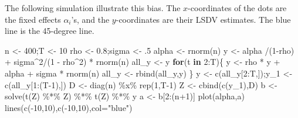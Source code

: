 \documentclass[
  12pt,
]{book}
\newenvironment{Shaded}{\begin{snugshade}}{\end{snugshade}}
\newcommand{\AttributeTok}[1]{\textcolor[rgb]{0.77,0.63,0.00}{#1}}
\newcommand{\ControlFlowTok}[1]{\textcolor[rgb]{0.13,0.29,0.53}{\textbf{#1}}}
\newcommand{\DecValTok}[1]{\textcolor[rgb]{0.00,0.00,0.81}{#1}}
\newcommand{\FloatTok}[1]{\textcolor[rgb]{0.00,0.00,0.81}{#1}}
\newcommand{\FunctionTok}[1]{\textcolor[rgb]{0.00,0.00,0.00}{#1}}
\newcommand{\NormalTok}[1]{#1}
\newcommand{\OtherTok}[1]{\textcolor[rgb]{0.56,0.35,0.01}{#1}}
\newcommand{\SpecialCharTok}[1]{\textcolor[rgb]{0.00,0.00,0.00}{#1}}
\newcommand{\StringTok}[1]{\textcolor[rgb]{0.31,0.60,0.02}{#1}}
\theoremstyle{definition}
\theoremstyle{definition}
\theoremstyle{definition}
\theoremstyle{definition}
\theoremstyle{remark}
\begin{document}
The following simulation illustrate this bias. The \(x\)-coordinates of the dots are the fixed effects \(\alpha_i\)'s, and the \(y\)-coordinates are their LSDV estimates. The blue line is the 45-degree line.

\begin{Shaded}
\begin{Highlighting}[]
\NormalTok{n }\OtherTok{\textless{}{-}} \DecValTok{400}\NormalTok{;T }\OtherTok{\textless{}{-}} \DecValTok{10}
\NormalTok{rho }\OtherTok{\textless{}{-}} \FloatTok{0.8}\NormalTok{;sigma }\OtherTok{\textless{}{-}}\NormalTok{ .}\DecValTok{5}
\NormalTok{alpha }\OtherTok{\textless{}{-}} \FunctionTok{rnorm}\NormalTok{(n)}
\NormalTok{y }\OtherTok{\textless{}{-}}\NormalTok{ alpha }\SpecialCharTok{/}\NormalTok{(}\DecValTok{1}\SpecialCharTok{{-}}\NormalTok{rho) }\SpecialCharTok{+}\NormalTok{ sigma}\SpecialCharTok{\^{}}\DecValTok{2}\SpecialCharTok{/}\NormalTok{(}\DecValTok{1} \SpecialCharTok{{-}}\NormalTok{ rho}\SpecialCharTok{\^{}}\DecValTok{2}\NormalTok{) }\SpecialCharTok{*} \FunctionTok{rnorm}\NormalTok{(n)}
\NormalTok{all\_y }\OtherTok{\textless{}{-}}\NormalTok{ y}
\ControlFlowTok{for}\NormalTok{(t }\ControlFlowTok{in} \DecValTok{2}\SpecialCharTok{:}\NormalTok{T)\{}
\NormalTok{  y }\OtherTok{\textless{}{-}}\NormalTok{ rho }\SpecialCharTok{*}\NormalTok{ y }\SpecialCharTok{+}\NormalTok{ alpha }\SpecialCharTok{+}\NormalTok{ sigma }\SpecialCharTok{*} \FunctionTok{rnorm}\NormalTok{(n)}
\NormalTok{  all\_y }\OtherTok{\textless{}{-}} \FunctionTok{rbind}\NormalTok{(all\_y,y)}
\NormalTok{\}}
\NormalTok{y   }\OtherTok{\textless{}{-}} \FunctionTok{c}\NormalTok{(all\_y[}\DecValTok{2}\SpecialCharTok{:}\NormalTok{T,]);y\_1 }\OtherTok{\textless{}{-}} \FunctionTok{c}\NormalTok{(all\_y[}\DecValTok{1}\SpecialCharTok{:}\NormalTok{(T}\DecValTok{{-}1}\NormalTok{),])}
\NormalTok{D }\OtherTok{\textless{}{-}} \FunctionTok{diag}\NormalTok{(n) }\SpecialCharTok{\%x\%} \FunctionTok{rep}\NormalTok{(}\DecValTok{1}\NormalTok{,T}\DecValTok{{-}1}\NormalTok{)}
\NormalTok{Z }\OtherTok{\textless{}{-}} \FunctionTok{cbind}\NormalTok{(}\FunctionTok{c}\NormalTok{(y\_1),D)}
\NormalTok{b }\OtherTok{\textless{}{-}} \FunctionTok{solve}\NormalTok{(}\FunctionTok{t}\NormalTok{(Z) }\SpecialCharTok{\%*\%}\NormalTok{ Z) }\SpecialCharTok{\%*\%} \FunctionTok{t}\NormalTok{(Z) }\SpecialCharTok{\%*\%}\NormalTok{ y}
\NormalTok{a }\OtherTok{\textless{}{-}}\NormalTok{ b[}\DecValTok{2}\SpecialCharTok{:}\NormalTok{(n}\SpecialCharTok{+}\DecValTok{1}\NormalTok{)]}
\FunctionTok{plot}\NormalTok{(alpha,a)}
\FunctionTok{lines}\NormalTok{(}\FunctionTok{c}\NormalTok{(}\SpecialCharTok{{-}}\DecValTok{10}\NormalTok{,}\DecValTok{10}\NormalTok{),}\FunctionTok{c}\NormalTok{(}\SpecialCharTok{{-}}\DecValTok{10}\NormalTok{,}\DecValTok{10}\NormalTok{),}\AttributeTok{col=}\StringTok{"blue"}\NormalTok{)}
\end{Highlighting}
\end{Shaded}
\end{document}
